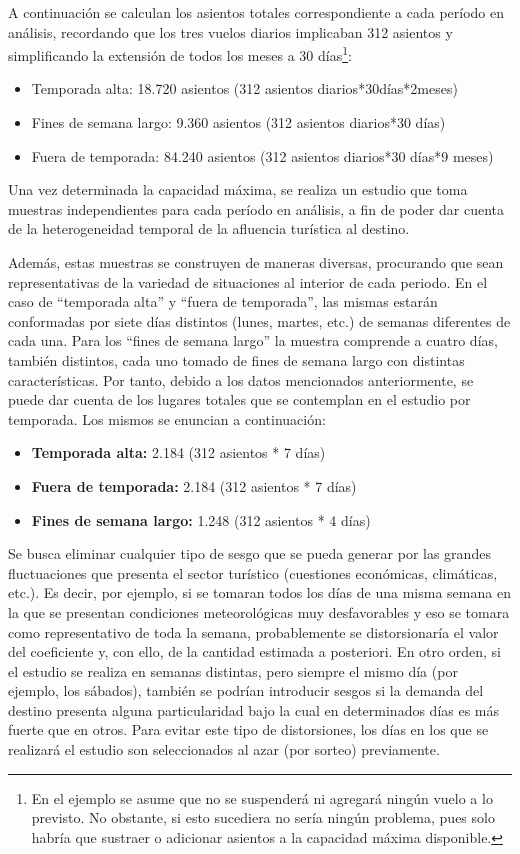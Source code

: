 \documentclass[
]{book}
\begin{document}
A continuación se calculan los asientos totales correspondiente a cada período en análisis, recordando que los tres vuelos diarios implicaban 312 asientos y simplificando la extensión de todos los meses a 30 días\footnote{En el ejemplo se asume que no se suspenderá ni agregará ningún vuelo a lo previsto. No obstante, si esto sucediera no sería ningún problema, pues solo habría que sustraer o adicionar asientos a la capacidad máxima disponible.}:

\begin{itemize}
\item
  Temporada alta: 18.720 asientos (312 asientos diarios*30días*2meses)
\item
  Fines de semana largo: 9.360 asientos (312 asientos diarios*30 días)
\item
  Fuera de temporada: 84.240 asientos (312 asientos diarios*30 días*9 meses)
\end{itemize}

Una vez determinada la capacidad máxima, se realiza un estudio que toma muestras independientes para cada período en análisis, a fin de poder dar cuenta de la heterogeneidad temporal de la afluencia turística al destino.

Además, estas muestras se construyen de maneras diversas, procurando que sean representativas de la variedad de situaciones al interior de cada periodo. En el caso de ``temporada alta'' y ``fuera de temporada'', las mismas estarán conformadas por siete días distintos (lunes, martes, etc.) de semanas diferentes de cada una. Para los ``fines de semana largo'' la muestra comprende a cuatro días, también distintos, cada uno tomado de fines de semana largo con distintas características. Por tanto, debido a los datos mencionados anteriormente, se puede dar cuenta de los lugares totales que se contemplan en el estudio por temporada. Los mismos se enuncian a continuación:

\begin{itemize}
\item
  \textbf{Temporada alta:} 2.184 (312 asientos * 7 días)
\item
  \textbf{Fuera de temporada:} 2.184 (312 asientos * 7 días)
\item
  \textbf{Fines de semana largo:} 1.248 (312 asientos * 4 días)
\end{itemize}

\hfill\break
Se busca eliminar cualquier tipo de sesgo que se pueda generar por las grandes fluctuaciones que presenta el sector turístico (cuestiones económicas, climáticas, etc.). Es decir, por ejemplo, si se tomaran todos los días de una misma semana en la que se presentan condiciones meteorológicas muy desfavorables y eso se tomara como representativo de toda la semana, probablemente se distorsionaría el valor del coeficiente y, con ello, de la cantidad estimada a posteriori. En otro orden, si el estudio se realiza en semanas distintas, pero siempre el mismo día (por ejemplo, los sábados), también se podrían introducir sesgos si la demanda del destino presenta alguna particularidad bajo la cual en determinados días es más fuerte que en otros. Para evitar este tipo de distorsiones, los días en los que se realizará el estudio son seleccionados al azar (por sorteo) previamente.
\end{document}
